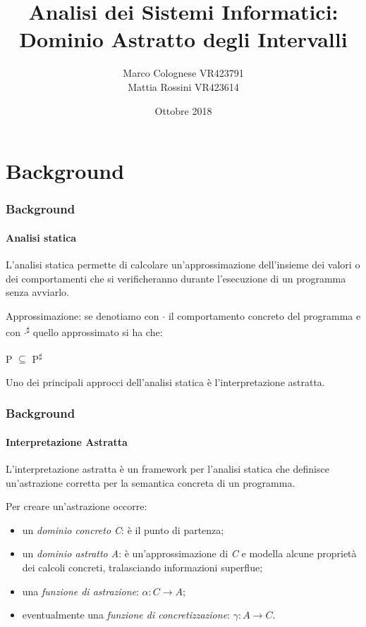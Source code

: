 \documentclass{beamer}
\title{Analisi dei Sistemi Informatici:\\ Dominio Astratto degli Intervalli}
\author{Marco Colognese \scriptsize VR423791 \\ \normalsize Mattia Rossini \scriptsize VR423614\normalsize}
\institute{Università degli Studi di Verona\\ \fontsize{2.3mm}{4mm} \selectfont Corso di Laurea Magistrale in Ingegneria e Scienze Informatiche}
\date{\newline \scriptsize Ottobre 2018\normalsize}
\begin{document}
	\begin{frame}
		\titlepage
	\end{frame}


\section[Sommario]{}
	\begin{frame}
		\tableofcontents
	\end{frame}


\section{Background}
	\begin{frame}
		\frametitle{Background}
		\framesubtitle{Analisi statica}
		L’\alert{analisi statica} permette di calcolare un'approssimazione dell'insieme dei valori o dei comportamenti che si verificheranno durante l'esecuzione di un programma senza avviarlo.
		
		\bigskip
		\alert{Approssimazione}: se denotiamo con \textlbrackdbl $\cdot$\textrbrackdbl\hspace{0.01cm} il comportamento concreto del programma e con \textlbrackdbl $\cdot$\textrbrackdbl\textsuperscript{$\sharp$} quello approssimato si ha che:
		\begin{center}
			\textlbrackdbl P\textrbrackdbl\hspace{0.01cm} $\subseteq$ \textlbrackdbl P\textrbrackdbl\textsuperscript{$\sharp$}
		\end{center}
	
		\bigskip
		Uno dei principali approcci dell'analisi statica è l'interpretazione astratta.
		
	\end{frame}

	\begin{frame}
		\frametitle{Background}
		\framesubtitle{Interpretazione Astratta}
		L’\alert{interpretazione astratta} è un framework per l'analisi statica che definisce un'astrazione corretta per la semantica concreta di un programma.
		
		\bigskip
		Per creare un'\alert{astrazione} occorre:
		\begin{itemize}
			\item un \textit{dominio concreto C}: è il punto di partenza;
			\item un \textit{dominio astratto A}: è un'approssimazione di \textit{C} e modella alcune proprietà dei calcoli concreti, tralasciando informazioni superflue;
			\item una \textit{funzione di astrazione}: $\alpha: C \rightarrow A$;
			\item eventualmente una \textit{funzione di concretizzazione}: $\gamma: A \rightarrow C$.
		\end{itemize}
	

	\end{frame}
\end{document}
